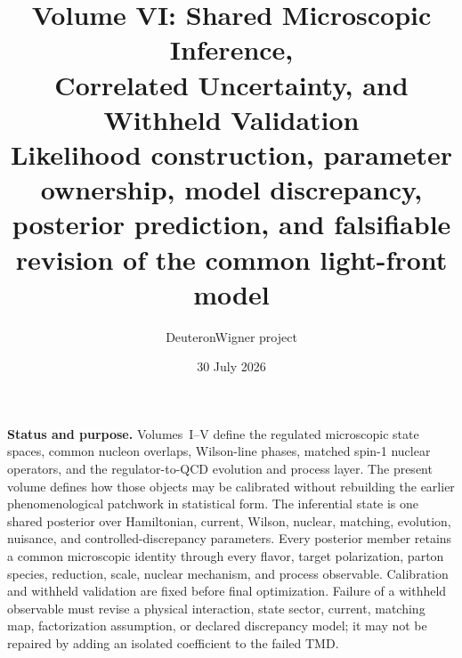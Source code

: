 \documentclass[11pt]{article}
\title{\vspace{-1.0cm}
{\color{navy}\bfseries Volume VI: Shared Microscopic Inference,\\[2mm]
Correlated Uncertainty, and Withheld Validation}\\[4mm]
\large Likelihood construction, parameter ownership, model discrepancy,\\
posterior prediction, and falsifiable revision of the common light-front model}
\author{DeuteronWigner project}
\date{30 July 2026}
\begin{document}
\maketitle

\begin{center}
\begin{minipage}{0.94\textwidth}
\colorbox{softblue}{\parbox{0.96\textwidth}{
\textbf{Status and purpose.}
Volumes~I--V define the regulated microscopic state spaces, common nucleon
overlaps, Wilson-line phases, matched spin-1 nuclear operators, and the
regulator-to-QCD evolution and process layer.  The present volume defines how
those objects may be calibrated without rebuilding the earlier phenomenological
patchwork in statistical form.  The inferential state is one shared posterior
over Hamiltonian, current, Wilson, nuclear, matching, evolution, nuisance, and
controlled-discrepancy parameters.  Every posterior member retains a common
microscopic identity through every flavor, target polarization, parton
species, reduction, scale, nuclear mechanism, and process observable.
Calibration and withheld validation are fixed before final optimization.
Failure of a withheld observable must revise a physical interaction, state
sector, current, matching map, factorization assumption, or declared
discrepancy model; it may not be repaired by adding an isolated coefficient to
the failed TMD.
}}
\end{minipage}
\end{center}
\end{document}
